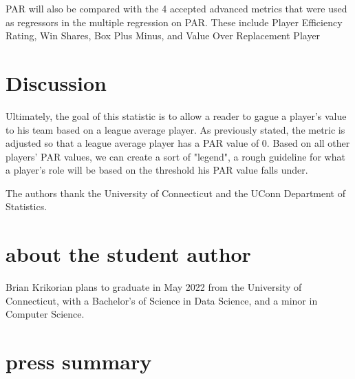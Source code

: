 \documentclass[12pt]{article}
\begin{document}
PAR will also be compared with the 4 accepted advanced metrics that were used as regressors in the multiple regression on PAR. These include Player Efficiency Rating, Win Shares, Box Plus Minus, and Value Over Replacement Player

\section{Discussion}
Ultimately, the goal of this statistic is to allow a reader to gague a player's value to his team based on a league average player. As previously stated, the metric is adjusted so that a league average player has a PAR value of 0. Based on all other players' PAR values, we can create a sort of "legend", a rough guideline for what a player's role will be based on the threshold his PAR value falls under.


%
The authors thank the University of Connecticut and the UConn Department of Statistics.






\section*{about the student author}
Brian Krikorian plans to graduate in May 2022 from the University of Connecticut, with a Bachelor's of Science in Data Science, and a minor in Computer Science.

\section*{press summary}
\end{document}
